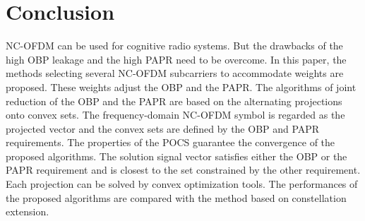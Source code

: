 \documentclass[paper]{ieice}
\begin{document}
\section{Conclusion}
\label{sec:conclusion}
NC-OFDM can be used for cognitive radio systems. But the drawbacks of the high OBP leakage and the high PAPR need to be overcome. In this paper, the methods selecting several NC-OFDM subcarriers to accommodate weights are proposed.  These weights adjust the OBP and the PAPR. The algorithms of joint reduction of the OBP and the PAPR are based on the alternating projections onto convex sets. The frequency-domain NC-OFDM symbol is regarded as the projected vector and the convex sets are defined by the OBP and PAPR requirements.  The properties of the POCS guarantee the convergence of the proposed algorithms. The solution signal vector satisfies either the OBP or the PAPR requirement and is closest to the set constrained by the other requirement. Each projection can be solved by convex optimization tools. The performances of the proposed algorithms are compared with the method based on constellation extension.

%
%
\end{document}
